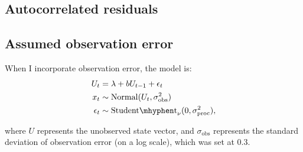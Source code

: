 \documentclass[11pt]{article}
\begin{document}
\subsection{Autocorrelated residuals}

\subsection{Assumed observation error}

When I incorporate observation error, the model is:
\begin{align*}
U_t &= \lambda + b U_{t-1} + \epsilon_t\\
x_t &\sim \mathrm{Normal}(U_t, \sigma_\mathrm{obs}^2)\\
\epsilon_t &\sim \mathrm{Student\mhyphen t}_\nu(0, \sigma_\mathrm{proc}^2),
\end{align*}

\noindent
where $U$ represents the unobserved state vector, and $\sigma_\mathrm{obs}$ represents the standard deviation of observation error (on a log scale), which was set at 0.3.


\renewcommand{\thetable}{S\arabic{table}}
\setcounter{table}{0}



\renewcommand{\thefigure}{S\arabic{figure}}
\setcounter{figure}{0}


\end{document}
